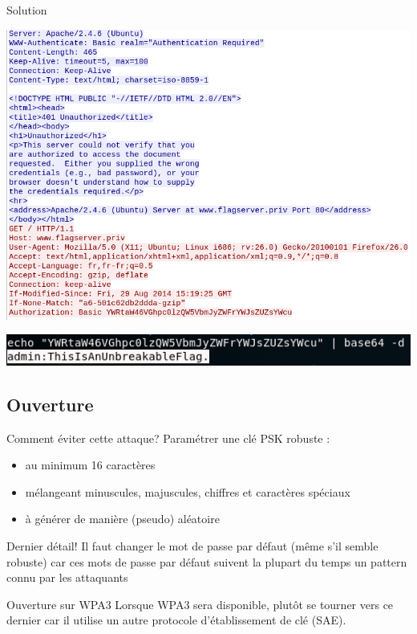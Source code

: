 \documentclass{beamer}
\begin{document}
	\begin{frame}{Solution}
		\begin{center}
			\includegraphics[scale=0.4]{./pictures/118-wpa-forensics-wireshark-follow.png}
		\end{center}
		\begin{center}
			\includegraphics[scale=0.5]{./pictures/118-wpa-forensics-flag.png}
		\end{center}
	\end{frame}

	\subsection{Ouverture}

	\begin{frame}
	\begin{block}{Comment éviter cette attaque?}
		Paramétrer une clé PSK robuste :
		\begin{itemize}
			\item au minimum 16 caractères
			\item mélangeant minuscules, majuscules, chiffres et caractères spéciaux
			\item à générer de manière (pseudo) aléatoire
		\end{itemize}
	\end{block}
	\begin{alertblock}{Dernier détail!}
		Il faut changer le mot de passe par défaut (même s'il semble robuste) car ces mots de passe par défaut suivent la plupart du temps un pattern connu par les attaquants
	\end{alertblock}
	\begin{block}{Ouverture sur WPA3}
		Lorsque WPA3 sera disponible, plutôt se tourner vers ce dernier car il utilise un autre protocole d'établissement de clé (SAE).
	\end{block}
	\end{frame}
\end{document}
